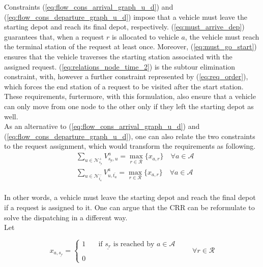 Constraints (\ref{eq:flow_cons_arrival_graph_u_d}) and (\ref{eq:flow_cons_departure_graph_u_d}) impose that a vehicle must leave the starting depot and reach its final depot, respectively.  (\ref{eq:must_arrive_dep}) guarantees that, when a request $r$ is allocated to vehicle $a$, the vehicle must reach the terminal station of the request at least once. Moreover, (\ref{eq:must_go_start}) ensures that the vehicle traverses the starting station associated with the assigned request. (\ref{eq:relations_node_time_2}) is the subtour elimination constraint, with, however a further constraint represented by (\ref{eq:req_order}), which forces the end station of a request to be visited after the start station. \\
These requirements, furtermore, with this formulation, also ensure that a vehicle can only move from one node to the other only if they left the starting depot as well. \\ 
As an alternative to (\ref{eq:flow_cons_arrival_graph_u_d}) and (\ref{eq:flow_cons_departure_graph_u_d}), one can also relate the two constraints to the request assignment, which would transform the requirements as following. 
\begin{align}
	&\sum_{ u \in \mathcal{N}^+_{\underline{s_a}} }V^a_{ \underline{s_a},u} = \underset{ r \in \mathcal{R}}{\max}\{x_{a,r}\} \quad  \forall a \in \mathcal{A}
	\label{eq:flow_cons_arrival_graph_u_d2}\\ %
	&\sum_{u \in \mathcal{N}^-_{\bar{t_a}} } V^a_{u, \bar{t_a}} = \underset{ r \in \mathcal{R}}{\max}\{x_{a,r}\}  \quad  \forall a \in \mathcal{A}\label{eq:flow_cons_departure_graph_u_d2}
\end{align}
\\

In other words, a vehicle must leave the starting depot and reach the final depot if a request is assigned to it. 
\iffalse
One can argue that the CRR can be reformulate to solve the dispatching in a different way. \\
Let 

\begin{equation*}
	x_{a,\underline{s_r} }= 
	\begin{cases} 
		1 & \quad \text{if $\underline{s_r} $ is reached by }  a \in \mathcal{A}\\
		\\
		0
	\end{cases}
	\quad\quad \forall r \in \mathcal{R}
	\label{eq:var_dispatching}
\end{equation*}

